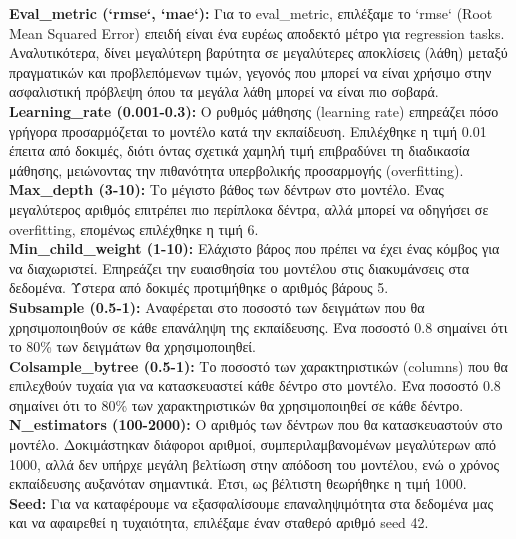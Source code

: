 \documentclass{llncs}
\begin{document}
\noindent \textbf{Eval\_metric (`rmse`, `mae`):}
Για το eval\_metric, επιλέξαμε το `rmse` (Root Mean Squared Error) επειδή είναι ένα ευρέως αποδεκτό μέτρο για regression tasks. Αναλυτικότερα, δίνει μεγαλύτερη βαρύτητα σε μεγαλύτερες αποκλίσεις (λάθη) μεταξύ πραγματικών και προβλεπόμενων τιμών, γεγονός που μπορεί να είναι χρήσιμο στην ασφαλιστική πρόβλεψη όπου τα μεγάλα λάθη μπορεί να είναι πιο σοβαρά.\\

\noindent \textbf{Learning\_rate (0.001-0.3):}
Ο ρυθμός μάθησης (learning rate) επηρεάζει πόσο γρήγορα προσαρμόζεται το μοντέλο κατά την εκπαίδευση. Επιλέχθηκε η τιμή 0.01 έπειτα από δοκιμές, διότι όντας σχετικά χαμηλή τιμή επιβραδύνει τη διαδικασία μάθησης, μειώνοντας την πιθανότητα υπερβολικής προσαρμογής (overfitting).\\

\noindent \textbf{Max\_depth (3-10):}
Το μέγιστο βάθος των δέντρων στο μοντέλο. Ένας μεγαλύτερος αριθμός επιτρέπει πιο περίπλοκα δέντρα, αλλά μπορεί να οδηγήσει σε overfitting, επομένως επιλέχθηκε η τιμή 6. \\

\noindent \textbf{Min\_child\_weight (1-10):}
Ελάχιστο βάρος που πρέπει να έχει ένας κόμβος για να διαχωριστεί. Επηρεάζει την ευαισθησία του μοντέλου στις διακυμάνσεις στα δεδομένα. Ύστερα από δοκιμές προτιμήθηκε ο αριθμός βάρους 5.\\

\noindent \textbf{Subsample (0.5-1):}
Αναφέρεται στο ποσοστό των δειγμάτων που θα χρησιμοποιηθούν σε κάθε επανάληψη της εκπαίδευσης. Ένα ποσοστό 0.8 σημαίνει ότι το 80\% των δειγμάτων θα χρησιμοποιηθεί.\\

\noindent \textbf{Colsample\_bytree (0.5-1):}
Το ποσοστό των χαρακτηριστικών (columns) που θα επιλεχθούν τυχαία για να κατασκευαστεί κάθε δέντρο στο μοντέλο. Ένα ποσοστό 0.8 σημαίνει ότι το 80\% των χαρακτηριστικών θα χρησιμοποιηθεί σε κάθε δέντρο.\\

\noindent \textbf{N\_estimators (100-2000):}
Ο αριθμός των δέντρων που θα κατασκευαστούν στο μοντέλο. Δοκιμάστηκαν διάφοροι αριθμοί, συμπεριλαμβανομένων μεγαλύτερων από 1000, αλλά δεν υπήρχε μεγάλη βελτίωση στην απόδοση του μοντέλου, ενώ ο χρόνος εκπαίδευσης αυξανόταν σημαντικά. Έτσι, ως βέλτιστη θεωρήθηκε η τιμή 1000.\\

\noindent \textbf{Seed:}
Για να καταφέρουμε να εξασφαλίσουμε επαναληψιμότητα στα δεδομένα μας και να αφαιρεθεί η τυχαιότητα, επιλέξαμε έναν σταθερό αριθμό seed 42. \\
\end{document}
